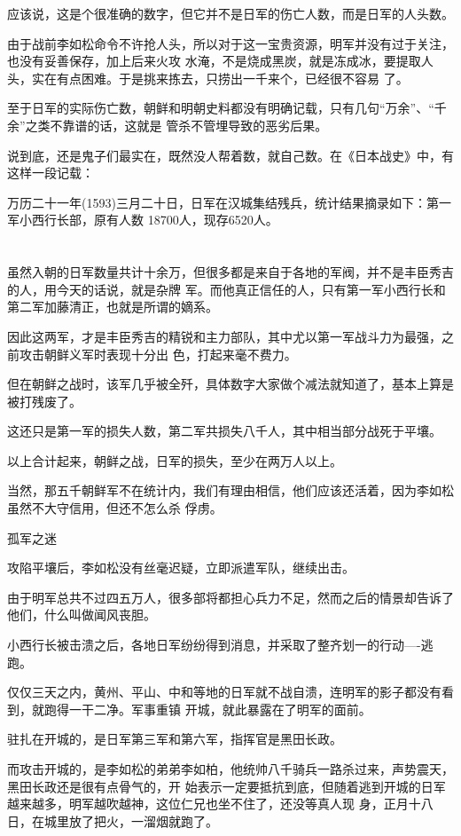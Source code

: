 \documentclass[11pt,a4paper,onecolumn]{article}
\begin{document}
应该说，这是个很准确的数字，但它并不是日军的伤亡人数，而是日军的人头数。

由于战前李如松命令不许抢人头，所以对于这一宝贵资源，明军并没有过于关注，也没有妥善保存，加上后来火攻
水淹，不是烧成黑炭，就是冻成冰，要提取人头，实在有点困难。于是挑来拣去，只捞出一千来个，已经很不容易
了。

至于日军的实际伤亡数，朝鲜和明朝史料都没有明确记载，只有几句``万余''、``千余''之类不靠谱的话，这就是
管杀不管埋导致的恶劣后果。

说到底，还是鬼子们最实在，既然没人帮着数，就自己数。在《日本战史》中，有这样一段记载：

万历二十一年(1593)三月二十日，日军在汉城集结残兵，统计结果摘录如下：第一军小西行长部，原有人数
18700人，现存6520人。

\section[\thesection]{}

虽然入朝的日军数量共计十余万，但很多都是来自于各地的军阀，并不是丰臣秀吉的人，用今天的话说，就是杂牌
军。而他真正信任的人，只有第一军小西行长和第二军加藤清正，也就是所谓的嫡系。

因此这两军，才是丰臣秀吉的精锐和主力部队，其中尤以第一军战斗力为最强，之前攻击朝鲜义军时表现十分出
色，打起来毫不费力。

但在朝鲜之战时，该军几乎被全歼，具体数字大家做个减法就知道了，基本上算是被打残废了。

这还只是第一军的损失人数，第二军共损失八千人，其中相当部分战死于平壤。

以上合计起来，朝鲜之战，日军的损失，至少在两万人以上。

当然，那五千朝鲜军不在统计内，我们有理由相信，他们应该还活着，因为李如松虽然不大守信用，但还不怎么杀
俘虏。

孤军之迷

攻陷平壤后，李如松没有丝毫迟疑，立即派遣军队，继续出击。

由于明军总共不过四五万人，很多部将都担心兵力不足，然而之后的情景却告诉了他们，什么叫做闻风丧胆。

小西行长被击溃之后，各地日军纷纷得到消息，并采取了整齐划一的行动----逃跑。

仅仅三天之内，黄州、平山、中和等地的日军就不战自溃，连明军的影子都没有看到，就跑得一干二净。军事重镇
开城，就此暴露在了明军的面前。

驻扎在开城的，是日军第三军和第六军，指挥官是黑田长政。

而攻击开城的，是李如松的弟弟李如柏，他统帅八千骑兵一路杀过来，声势震天，黑田长政还是很有点骨气的，开
始表示一定要抵抗到底，但随着逃到开城的日军越来越多，明军越吹越神，这位仁兄也坐不住了，还没等真人现
身，正月十八日，在城里放了把火，一溜烟就跑了。
\end{document}
